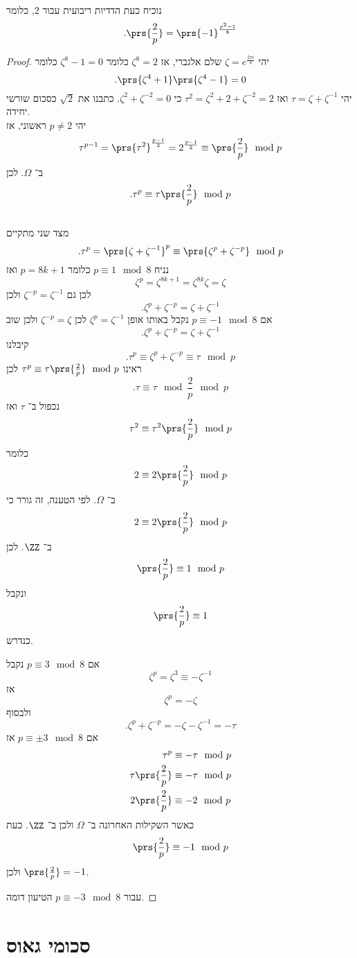\documentclass[a4paper,10pt,twoside,openany]{book}
\begin{document}
נוכיח כעת הדדיות ריבועית עבור
$2$,
כלומר
\[\text{.}\prs{\frac{2}{p}} = \prs{-1}^{\frac{p^2 - 1}{8}}\]
\begin{proof}
יהי
$\zeta = e^{\frac{2\pi i}{8}}$
שלם אלגברי, אז
$\zeta^8 = 2$
כלומר
$\zeta^8 - 1 = 0$
כלומר
\[\text{.} \prs{\zeta^4 + 1}\prs{\zeta^4 - 1} = 0\]
יהי
$\tau = \zeta + \zeta^{-1}$
ואז
$\tau^2 = \zeta^2 + 2 + \zeta^{-2} = 2$
כי
$\zeta^2 + \zeta^{-2} = 0$.
כתבנו את
$\sqrt{2}$
כסכום שורשי יחידה.
\\
יהי
$p\neq 2$
ראשוני, אז
\[\tau^{p-1} = \prs{\tau^2}^{\frac{p-1}{2}} = 2^{\frac{p-1}{2}} \equiv \prs{\frac{2}{p}} \mod{p}\]
ב־%
$\Omega$.
לכן
\[\text{.} \tau^p \equiv \tau \prs{\frac{2}{p}} \mod{p}\]
\\
מצד שני מתקיים
\[\text{.} \tau^p = \prs{\zeta + \zeta^{-1}}^p \equiv \prs{\zeta^p + \zeta^{-p}} \mod{p}\]
נניח
$p \equiv 1 \mod{8}$
כלומר
$p = 8k + 1$
ואז
\[\zeta^p = \zeta^{8k+1} = \zeta^{8k}\zeta = \zeta\]
לכן גם
$\zeta^{-p} = \zeta^{-1}$
ולכן
\[\text{.} \zeta^p + \zeta^{-p} = \zeta + \zeta^{-1}\]
אם
$p \equiv -1 \mod{8}$
נקבל באותו אופן
$\zeta^p = \zeta^{-1}$
לכן
$\zeta^{-p} = \zeta$
ולכן שוב
\[\text{.} \zeta^p + \zeta^{-p} = \zeta + \zeta^{-1}\]
קיבלנו
\[\text{.} \tau^p \equiv \zeta^p + \zeta^{-p} \equiv \tau \mod{p}\]
ראינו
$\tau^p \equiv \tau \prs{\frac{2}{p}} \mod{p}$
לכן
\[\text{.} \tau \equiv \tau \mod{\frac{2}{p}} \mod{p}\]
נכפול ב־%
$\tau$
ואז
\[\tau^2 \equiv \tau^2 \prs{\frac{2}{p}} \mod{p}\]
כלומר
\[2 \equiv 2\prs{\frac{2}{p}} \mod{p}\]
ב־%
$\Omega$.
לפי הטענה, זה גורר כי
\[2 \equiv 2 \prs{\frac{2}{p}} \mod{p}\]
ב־%
$\ZZ$.
לכן
\[\prs{\frac{2}{p}} \equiv 1 \mod{p}\]
ונקבל
\[\prs{\frac{2}{p}} \equiv 1\]
כנדרש.

אם
$p \equiv 3 \mod{8}$
נקבל
\[\zeta^p = \zeta^3 \equiv -\zeta^{-1}\]
אז
\[\zeta^p = -\zeta\]
ולבסוף
\[\text{.} \zeta^p + \zeta^{-p} = -\zeta -\zeta^{-1} = -\tau\]
אם
$p \equiv \pm 3 \mod{8}$
אז
\begin{align*}
\tau^p &\equiv -\tau \mod{p} \\
\tau \prs{\frac{2}{p}} &\equiv -\tau \mod{p} \\
2 \prs{\frac{2}{p}} &\equiv -2 \mod{p}
\end{align*}
כאשר השקילות האחרונה
ב־%
$\Omega$
ולכן ב־%
$\ZZ$.
כעת
\[\prs{\frac{2}{p}} \equiv -1 \mod{p}\]
ולכן
$\prs{\frac{2}{p}} = -1$.

עבור
$p \equiv - 3 \mod{8}$
הטיעון דומה.
\end{proof}

\chapter{סכומי גאוס}
\end{document}
